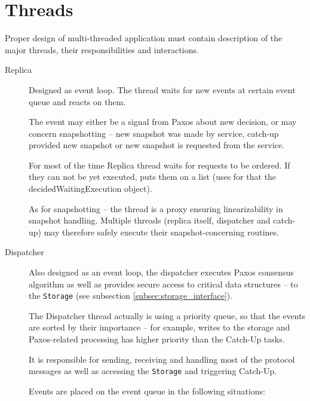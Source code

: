 \section{Threads}
\label{sec:threads}

Proper design of multi-threaded application must contain description of the major threads, their responsibilities and interactions.

\begin{description}
  \item[Replica] \hfill
    
    Designed as event loop. The thread waits for new events at certain event queue and reacts on them.

    The event may either be a signal from Paxos about new decision, or may concern snapshotting -- new snapshot was made by service, catch-up provided new snapshot or new snapshot is requested from the service.

    For most of the time Replica thread waits for requests to be ordered. If they can not be yet executed, puts them on a list (uses for that the decidedWaitingExecution object).
    
    As for snapshotting -- the thread is a proxy ensuring linearizability in snapshot handling.
    Multiple threads (replica itself, dispatcher and catch-up) may therefore safely execute their snapshot-concerning routines.
    
  \item[Dispatcher] \hfill \nopagebreak
    
    Also designed as an event loop, the dispatcher executes Paxos consensus algorithm as well as provides secure access to critical data structures -- to the \texttt{Storage} (see subsection \ref{subsec:storage_interface}).
    
    The Dispatcher thread actually is using a priority queue, so that the events are sorted by their importance -- for example, writes to the storage and Paxos-related processing has higher priority than the Catch-Up tasks.
    
    It is responsible for sending, receiving and handling most of the protocol messages as well as accessing the \texttt{Storage} and triggering Catch-Up.
    
    Events are placed on the event queue in the following situations:
    

\end{description}
